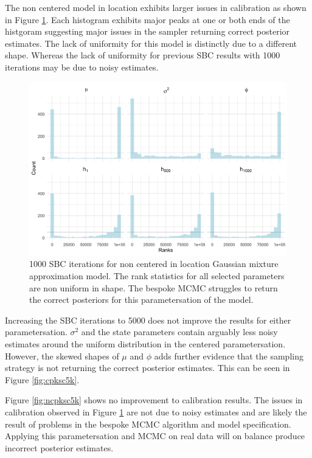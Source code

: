 \documentclass[12pt, a4paper]{article}
\begin{document}
    The non centered model in location exhibits larger issues in calibration as shown in Figure \ref{fig:ncpksc1k}. Each histogram exhibits major peaks at one or both ends of the histgoram suggesting major issues in the sampler returning correct posterior estimates. The lack of uniformity for this model is distinctly due to a different shape. Whereas the lack of uniformity for previous SBC results with 1000 iterations may be due to noisy estimates. 

    \begin{figure}[H]
        \centering
        \includegraphics[scale=0.1]{results/ksc_ncp_1k.png}
        \caption{1000 SBC iterations for non centered in location Gaussian mixture approximation model. The rank statistics for all selected parameters are non uniform in shape. The bespoke MCMC struggles to return the correct posteriors for this parametersation of the model.}
        \label{fig:ncpksc1k}
    \end{figure}

    Increasing the SBC iterations to 5000 does not improve the results for either parametersation. $\sigma^2$ and the state parameters contain arguably less noisy estimates around the uniform distribution in the centered parametersation. However, the skewed shapes of $\mu$ and $\phi$ adds further evidence that the sampling strategy is not returning the correct posterior estimates. This can be seen in Figure \ref{fig:cpksc5k}.

    Figure \ref{fig:ncpksc5k} shows no improvement to calibration results. The issues in calibration observed in Figure \ref{fig:ncpksc1k} are not due to noisy estimates and are likely the result of problems in the bespoke MCMC algorithm and model specification. Applying this parametersation and MCMC on real data will on balance produce incorrect posterior estimates. 
\end{document}
